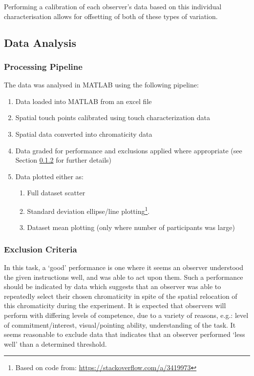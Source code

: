 Performing a calibration of each observer's data based on this individual characterisation allows for offsetting of both of these types of variation. 

\subsection{Data Analysis}
\subsubsection{Processing Pipeline}

The data was analysed in \gls{MATLAB} using the following pipeline:
\begin{enumerate}
\item Data loaded into \gls{MATLAB} from an excel file
\item Spatial touch points calibrated using touch characterization data
\item Spatial data converted into chromaticity data
\item Data graded for performance and exclusions applied where appropriate (see Section \ref{sec:exclusion} for further details) 
\item Data plotted either as:
\begin{enumerate}
\item Full dataset scatter %
\item Standard deviation ellipse/line plotting\footnote{Based on code from: \url{https://stackoverflow.com/a/3419973}}.%
\item Dataset mean plotting (only where number of participants was large)%
\end{enumerate}
\end{enumerate}

\subsubsection{Exclusion Criteria} \label{sec:exclusion}

In this task, a `good' performance is one where it seems an observer understood the given instructions well, and was able to act upon them. Such a performance should be indicated by data which suggests that an observer was able to repeatedly select their chosen chromaticity in spite of the spatial relocation of this chromaticity during the experiment. It is expected that observers will perform with differing levels of competence, due to a variety of reasons, e.g.: level of commitment/interest, visual/pointing ability, understanding of the task. It seems reasonable to exclude data that indicates that an observer performed `less well' than a determined threshold.

